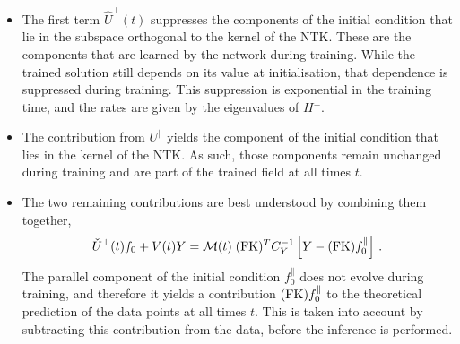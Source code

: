 \begin{itemize}
    \item The first term $\hat{U}^\perp(t)$ suppresses the components of the
    initial condition that lie in the subspace orthogonal to the kernel of the
    NTK. These are the components that are learned by the network during
    training. While the trained solution still depends on its value at
    initialisation, that dependence is suppressed during training. This
    suppression is exponential in the training time, and the rates are given by
    the eigenvalues of $H^{\perp}$.
    \item The contribution from $U^\parallel$ yields the component of the
    initial condition that lies in the kernel of the NTK. As such, those
    components remain unchanged during training and are part of the trained
    field at all times $t$. 
    \item The two remaining contributions are best understood by combining them
    together,
    \begin{align}
        \label{eq:DataCorrectedInference}
        \check{U}^{\perp}(t) f_{0} + V(t) Y 
            = \mathcal{M}(t)\; (\mathrm{FK})^T C_Y^{-1} \left[Y - (\mathrm{FK}) f_{0}^{\parallel}\right]\, .
    \end{align}
    The parallel component of the initial condition $f_{0}^{\parallel}$ does not
    evolve during training, and therefore it yields a contribution $(\mathrm{FK})
    f_{0}^{\parallel}$ to the theoretical prediction of the data points at all
    times $t$. This is taken into account by subtracting this contribution from
    the data, before the inference is performed.
\end{itemize}

